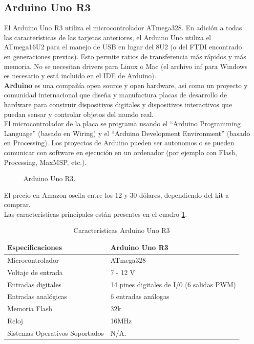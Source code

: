\documentclass[conference]{IEEEtran}
\begin{document}
	\subsection{Arduino Uno R3}
	El Arduino Uno R3 utiliza el microcontrolador ATmega328. En adición a todas las características de las tarjetas anteriores, el Arduino Uno utiliza el ATmega16U2 para el manejo de USB en lugar del 8U2 (o del FTDI encontrado en generaciones previas). Esto permite ratios de transferencia más rápidos y más memoria. No se necesitan drivers para Linux o Mac (el archivo inf para Windows es necesario y está incluido en el IDE de Arduino).\\
	\textbf{Arduino} es una compañía open source y open hardware, así como un proyecto y comunidad internacional que diseña y manufactura placas de desarrollo de hardware para construir dispositivos digitales y dispositivos interactivos que puedan sensar y controlar objetos del mundo real. \\
	El microcontrolador de la placa se programa usando el “Arduino Programming Language” (basado en Wiring) y el “Arduino Development Environment” (basado en Processing). Los proyectos de Arduino pueden ser autonomos o se pueden comunicar con software en ejecución en un ordenador (por ejemplo con Flash, Processing, MaxMSP, etc.).
	\begin{figure}[h]
	\caption{Arduino Uno R3.}
	\label{fig:ardui}
	\end{figure}
	 El precio en Amazon oscila entre los 12 y 30 dólares, dependiendo del kit a comprar.\\
	Las características principales están presentes en el cuadro \ref{tab:ardui01}.
	\begin{table}[h]
\begin{center}
	\begin{tabular}{|p{2.5cm}|p{5.5cm}|}
	\hline
	\textbf{Especificaciones} &\textbf{Arduino Uno R3} \\ \hline
	Microcontrolador  &ATmega328 \\\hline
	Voltaje de entrada &7 - 12 V \\\hline
	Entradas digitales &14 pines digitales de I/0 (6 salidas PWM) \\\hline
	Entradas analógicas & 6 entradas análogas \\\hline
	Memoria Flash &32k\\\hline
	Reloj &16MHz \\\hline
	Sistemas Operativos Soportados &N/A.\\\hline
\end{tabular}\vspace{0.25cm}
\caption{Características Arduino Uno R3}
\label{tab:ardui01}
\end{center}
\end{table}
\end{document}
